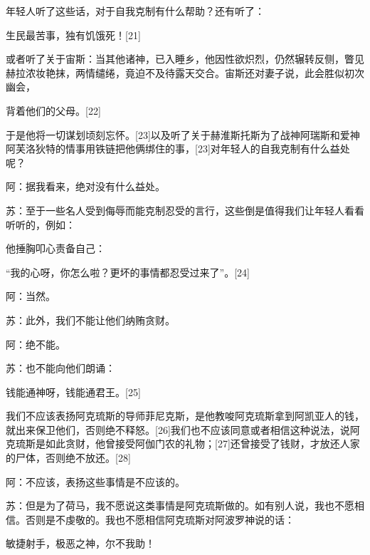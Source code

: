 \documentclass[12pt,oneside]{book}
\begin{document}
年轻人听了这些话，对于自我克制有什么帮助？还有听了：





生民最苦事，独有饥饿死！[21]





或者听了关于宙斯：当其他诸神，已入睡乡，他因性欲炽烈，仍然辗转反侧，瞥见赫拉浓妆艳抹，两情缱绻，竟迫不及待露天交合。宙斯还对妻子说，此会胜似初次幽会，





背着他们的父母。[22]





于是他将一切谋划顷刻忘怀。[23]以及听了关于赫淮斯托斯为了战神阿瑞斯和爱神阿芙洛狄特的情事用铁链把他俩绑住的事，[23]对年轻人的自我克制有什么益处呢？

阿：据我看来，绝对没有什么益处。

苏：至于一些名人受到侮辱而能克制忍受的言行，这些倒是值得我们让年轻人看看听听的，例如：





他捶胸叩心责备自己：

“我的心呀，你怎么啦？更坏的事情都忍受过来了”。[24]





阿：当然。

苏：此外，我们不能让他们纳贿贪财。

阿：绝不能。

苏：也不能向他们朗诵：





钱能通神呀，钱能通君王。[25]





我们不应该表扬阿克琉斯的导师菲尼克斯，是他教唆阿克琉斯拿到阿凯亚人的钱，就出来保卫他们，否则绝不释怒。[26]我们也不应该同意或者相信这种说法，说阿克琉斯是如此贪财，他曾接受阿伽门农的礼物；[27]还曾接受了钱财，才放还人家的尸体，否则绝不放还。[28]

阿：不应该，表扬这些事情是不应该的。

苏：但是为了荷马，我不愿说这类事情是阿克琉斯做的。如有别人说，我也不愿相信。否则是不虔敬的。我也不愿相信阿克琉斯对阿波罗神说的话：





敏捷射手，极恶之神，尔不我助！
\end{document}
